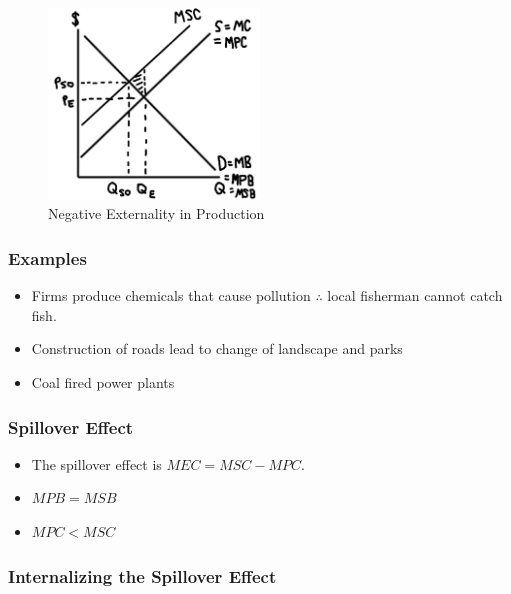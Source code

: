 \documentclass[
  letterpaper,
  DIV=11,
  numbers=noendperiod]{scrartcl}
\providecommand{\tightlist}{%
  \setlength{\itemsep}{0pt}\setlength{\parskip}{0pt}}\usepackage{longtable,booktabs,array}
\begin{document}
\begin{figure}[H]

{\centering \includegraphics[width=0.5\textwidth,height=\textheight]{img/neg-prod.png}

}

\caption{Negative Externality in Production}

\end{figure}%

\subsubsection{Examples}\label{examples-5}

\begin{itemize}
\tightlist
\item
  Firms produce chemicals that cause pollution \(\therefore\) local
  fisherman cannot catch fish.
\item
  Construction of roads lead to change of landscape and parks
\item
  Coal fired power plants
\end{itemize}

\subsubsection{Spillover Effect}\label{spillover-effect-3}

\begin{itemize}
\tightlist
\item
  The spillover effect is \(MEC = MSC-MPC\).
\item
  \(MPB = MSB\)
\item
  \(MPC < MSC\)
\end{itemize}

\subsubsection{Internalizing the Spillover
Effect}\label{internalizing-the-spillover-effect-3}
\end{document}
